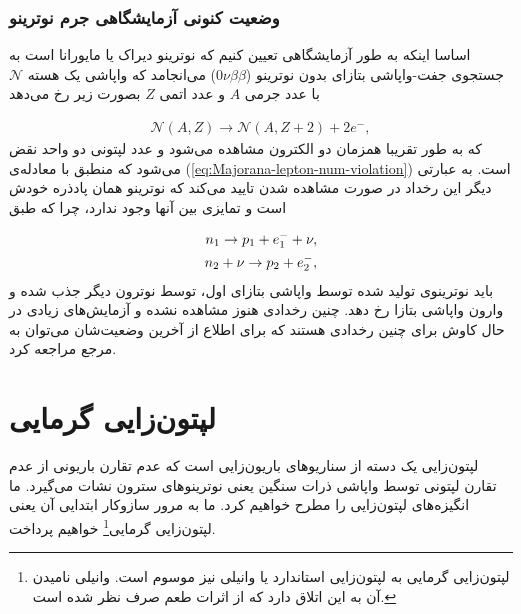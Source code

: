 \documentclass[a4paper]{book}
\begin{document}
\subsection{وضعیت کنونی آزمایشگاهی جرم نوترینو}
اساسا اینکه به طور آزمایشگاهی تعیین کنیم که نوترینو دیراک یا مایورانا است به جستجوی جفت-واپاشی بتازای بدون نوترینو ($0\nu \beta \beta$) می‌انجامد که واپاشی یک هسته {\footnotesize$\mathcal{N}$} با عدد جرمی {\footnotesize$A$} و عدد اتمی {\footnotesize$Z$} بصورت زیر رخ می‌دهد
\par
\vspace{-0.5cm}
{\footnotesize\begin{align}
	\mathcal{N}(A,Z)\to\mathcal{N}(A,Z+2)+2e^-,
\end{align}}
که به طور تقریبا همزمان دو الکترون مشاهده می‌شود و عدد لپتونی دو واحد نقض می‌شود که منطبق با معادله‌ی (\ref{eq:Majorana-lepton-num-violation}) است. به عبارتی دیگر این رخداد در صورت مشاهده شدن تایید می‌کند که نوترینو همان پادذره خودش است و تمایزی بین آنها وجود ندارد، چرا که طبق
\par
\vspace{-0.5cm}
{\footnotesize\begin{align}
	n_1 \to p_1+ e^-_1 + \nu,\notag\\
	n_2 + \nu \to p_2 + e^-_2,
\end{align}}
باید نوترینوی تولید شده توسط واپاشی بتازای اول، توسط نوترون دیگر جذب شده و وارون واپاشی بتازا رخ دهد. چنین رخدادی هنوز مشاهده نشده و آزمایش‌های زیادی در حال کاوش برای چنین رخدادی هستند که برای اطلاع از آخرین وضعیت‌شان می‌توان به مرجع \cite{Dolinski:2019nrj} مراجعه کرد.

\chapter{لپتون‌زایی گرمایی}
\label{chap:leptogenesis}
لپتون‌زایی یک دسته از سناریوهای باریون‌زایی است که عدم تقارن باریونی از عدم تقارن لپتونی توسط واپاشی ذرات سنگین یعنی نوترینوهای سترون نشات می‌گیرد. ما انگیزه‌های لپتون‌زایی را مطرح خواهیم کرد. ما به مرور سازوکار ابتدایی آن یعنی لپتون‌زایی گرمایی\footnote{لپتون‌زایی گرمایی به لپتون‌زایی استاندارد یا وانیلی نیز موسوم است. وانیلی نامیدن آن به این اتلاق دارد که از اثرات طعم صرف نظر شده است.} خواهیم پرداخت.
\end{document}
